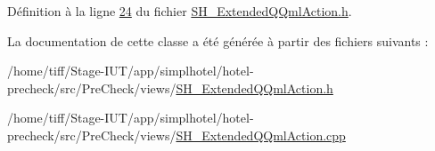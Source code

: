 Définition à la ligne \hyperlink{SH__ExtendedQQmlAction_8h_source_l00024}{24} du fichier \hyperlink{SH__ExtendedQQmlAction_8h_source}{S\-H\-\_\-\-Extended\-Q\-Qml\-Action.\-h}.



La documentation de cette classe a été générée à partir des fichiers suivants \-:\begin{DoxyCompactItemize}
\item 
/home/tiff/\-Stage-\/\-I\-U\-T/app/simplhotel/hotel-\/precheck/src/\-Pre\-Check/views/\hyperlink{SH__ExtendedQQmlAction_8h}{S\-H\-\_\-\-Extended\-Q\-Qml\-Action.\-h}\item 
/home/tiff/\-Stage-\/\-I\-U\-T/app/simplhotel/hotel-\/precheck/src/\-Pre\-Check/views/\hyperlink{SH__ExtendedQQmlAction_8cpp}{S\-H\-\_\-\-Extended\-Q\-Qml\-Action.\-cpp}\end{DoxyCompactItemize}
